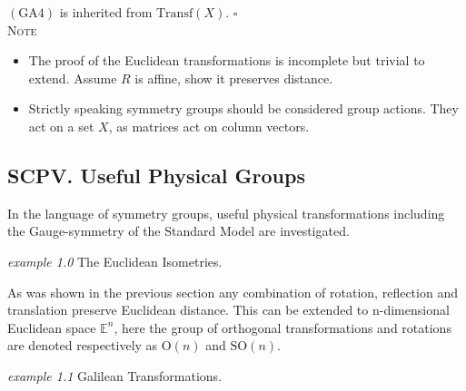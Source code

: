 $(\mathrm{GA}4)$ is inherited from $\mathrm{Transf}(X)$. \hfill $\square$\\
\textsc{Note}
\begin{itemize}
\item The proof of the Euclidean transformations is incomplete but trivial to extend. Assume $R$ is affine, show it preserves distance.
\item Strictly speaking symmetry groups should be considered group actions. They act on a set $X$, as matrices act on column vectors.
\end{itemize}
\subsection{SCPV. Useful Physical Groups}

In the language of symmetry groups, useful physical transformations including the Gauge-symmetry of the Standard Model are investigated.

\begin{flushleft}\textit{example 1.0} The Euclidean Isometries. \end{flushleft}

As was shown in the previous section any combination of rotation, reflection and translation preserve Euclidean distance. This can be extended to n-dimensional Euclidean space $\mathbb{E}^n$, here the group of orthogonal transformations and rotations are denoted respectively as $\mathrm{O}(n)$ and $\mathrm{SO}(n)$.

\begin{flushleft}\textit{example 1.1} Galilean Transformations.\end{flushleft}

